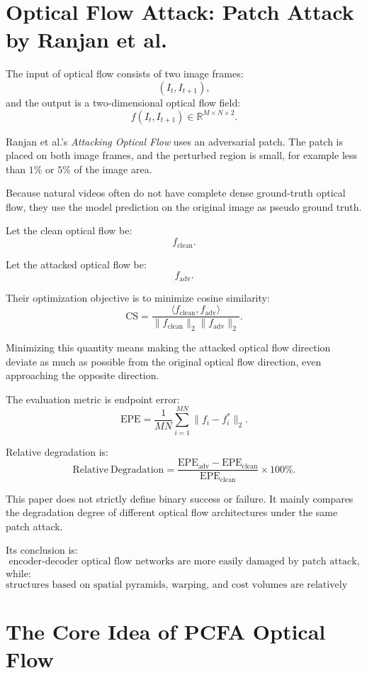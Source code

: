 \documentclass{article}
\begin{document}
\section{Optical Flow Attack: Patch Attack by Ranjan et al.}

The input of optical flow consists of two image frames:
\[
(I_t,I_{t+1}),
\]
and the output is a two-dimensional optical flow field:
\[
f(I_t,I_{t+1})\in \mathbb{R}^{M\times N\times 2}.
\]

Ranjan et al.'s \textit{Attacking Optical Flow} uses an adversarial patch. The patch is placed on both image frames, and the perturbed region is small, for example less than \(1\%\) or \(5\%\) of the image area.

Because natural videos often do not have complete dense ground-truth optical flow, they use the model prediction on the original image as pseudo ground truth.

Let the clean optical flow be:
\[
f_{\mathrm{clean}}.
\]

Let the attacked optical flow be:
\[
f_{\mathrm{adv}}.
\]

Their optimization objective is to minimize cosine similarity:
\[
\mathrm{CS}
=
\frac{
\langle f_{\mathrm{clean}}, f_{\mathrm{adv}}\rangle
}{
\|f_{\mathrm{clean}}\|_2
\|f_{\mathrm{adv}}\|_2
}.
\]

Minimizing this quantity means making the attacked optical flow direction deviate as much as possible from the original optical flow direction, even approaching the opposite direction.

The evaluation metric is endpoint error:
\[
\mathrm{EPE}
=
\frac{1}{MN}
\sum_{i=1}^{MN}
\|f_i-f_i^\ast\|_2.
\]

Relative degradation is:
\[
\mathrm{Relative\ Degradation}
=
\frac{
\mathrm{EPE}_{\mathrm{adv}}
-
\mathrm{EPE}_{\mathrm{clean}}
}{
\mathrm{EPE}_{\mathrm{clean}}
}
\times 100\%.
\]

This paper does not strictly define binary success or failure. It mainly compares the degradation degree of different optical flow architectures under the same patch attack.

Its conclusion is:
\[
\text{encoder-decoder optical flow networks are more easily damaged by patch attack,}
\]
while:
\[
\text{structures based on spatial pyramids, warping, and cost volumes are relatively more robust.}
\]

\section{The Core Idea of PCFA Optical Flow}
\end{document}
